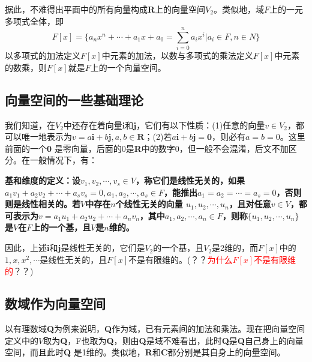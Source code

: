 \documentclass[12pt]{article}
\begin{document}
据此，不难得出平面中的所有向量构成\textbf{R}上的向量空间$V_2$。类似地，域$F$上的一元多项式全体，即
$$
F[x] = \{a_nx^n + \cdots + a_1x + a_0 = \sum_{i=0}^na_ix^i | a_i \in F, n \in N\}
$$
以多项式的加法定义$F[x]$中元素的加法，以数与多项式的乘法定义$F[x]$中元素的数乘，则$F[x]$就是$F$上的一个向量空间。

\subsection{向量空间的一些基础理论}
我们知道，在$V_2$中还存在着向量$\mathbf{i}$和$\mathbf{j}$，它们有以下性质：(1)任意的向量$v \in V_2$，都可以唯一地表示为$v = a\mathbf{i} + b\mathbf{j}, a, b \in \mathbf{R}$；(2)若$a\mathbf{i} + b\mathbf{j} = \textbf{0}$，则必有$a = b = 0$。这里前面的一个\textbf{0} 是零向量，后面的0是\textbf{R}中的数字0，但一般不会混淆，后文不加区分。在一般情况下，有：
\begin{mdframed}[
linecolor=black!40,outerlinewidth=1pt,roundcorner=.5em,innertopmargin=1ex,innerbottommargin=.5\baselineskip,innerrightmargin=1em,innerleftmargin=1em,backgroundcolor=gray!5,
]
\textbf{
基和维度的定义：设$v_1, v_2, \cdots, v_s \in V$，称它们是线性无关的，如果$a_1v_1 + a_2v_2 + \cdots + a_sv_s = 0, a_1, a_2, \cdots, a_s \in F$，能推出$a_1 = a_2 = \cdots = a_s = 0$，否则则是线性相关的。若$V$中存在$n$个线性无关的向量 $u_1, u_2, \cdots, u_n$，且对任意$v \in V$，都可表示为$v = a_1u_1 + a_2u_2 + \cdots + a_nv_n$，其中$a_1, a_2, \cdots, a_n \in F$，则称$\{u_1, u_2, \cdots, u_n\}$是$V$在$F$上的一个基，且$V$是$n$维的。
}
\end{mdframed}

因此，上述$\mathbf{i}$和$\mathbf{j}$是线性无关的，它们是$V_2$的一个基，且$V_2$是2维的，而$F[x]$中的$1, x, x^2, \cdots$是线性无关的，且$F[x]$不是有限维的。(？？\textcolor{red}{为什么$F[x]$不是有限维的}？？)

\subsection{数域作为向量空间}
以有理数域\textbf{Q}为例来说明，\textbf{Q}作为域，已有元素间的加法和乘法。现在把向量空间定义中的$V$取为\textbf{Q}，F也取为\textbf{Q}，则由\textbf{Q}是域不难看出，此时\textbf{Q}是\textbf{Q}自己身上的向量空间，而且此时\textbf{Q} 是1维的。类似地，\textbf{R}和\textbf{C}都分别是其自身上的向量空间。
\end{document}
